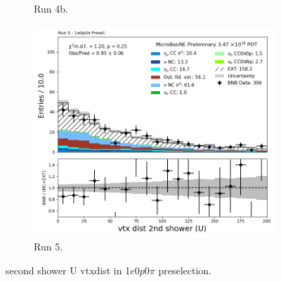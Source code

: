 \begin{figure}[H]
\begin{subfigure}[t]{0.32\linewidth}
        \caption{Run 4b.}
    \end{subfigure}%
    \hspace{0.2cm}%
    \begin{subfigure}[t]{0.32\linewidth}
        \includegraphics[width=\linewidth]{technote/Appendix_Preselection/Figures/1e0p0pi/Run5/secondshower_U_vtxdist_Run5_1e0p0pi_Presel.png}
        \caption{Run 5.}
    \end{subfigure}
    \caption{second shower U vtxdist in 1$e$0$p$0$\pi$ preselection.}
\end{figure}

